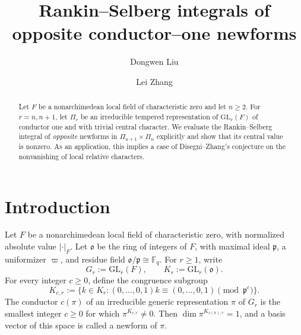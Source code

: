 \documentclass[11pt, a4paper]{amsart}
\newcommand{\GL}{{\mathrm{GL}}}
\newcommand{\p}{\frac{\partial\bar\partial}{\Pi i}}
\renewcommand{\p}{\mathfrak p}
\renewcommand{\o}{\mathfrak o}
\newcommand{\abs}[1]{\lvert#1\rvert}
\theoremstyle{plain}
\theoremstyle{plain}
\theoremstyle{plain}
\theoremstyle{plain}
\theoremstyle{remark}
\theoremstyle{definition}
\theoremstyle{plain}
\numberwithin{equation}{section}
\begin{document}
\title[Rankin--Selberg integrals of opposite conductor-one  newforms]{Rankin--Selberg integrals of opposite conductor--one newforms}

 \author[D. Liu]{Dongwen Liu}
\address{School of Mathematical Sciences, Zhejiang University, 866 Yuhangtang Road, Hangzhou 310058, P.R. China}

\author[L. Zhang]{Lei Zhang}
\address{Department of Mathematics, National University of Singapore, Singapore 119076}




\begin{abstract}
Let $F$ be a nonarchimedean local field of characteristic zero and let $n\geq2$.  For
$r=n,n+1$, let $\Pi_r$ be an irreducible tempered representation of
$\GL_r(F)$ of conductor one and with trivial central character.  
We evaluate the Rankin--Selberg integral of {\it opposite} newforms in $\Pi_{n+1}\times  \Pi_n$ explicitly and show that its central value is nonzero. As an application, this implies a case of Disegni--Zhang's conjecture on the nonvanishing of local relative characters.
\end{abstract}

\maketitle



\section{Introduction}
\label{sec:intro}


Let $F$ be a nonarchimedean local field of characteristic zero, with normalized absolute value $\abs{\cdot}_F$.  Let $\o$ be the ring of integers of $F$, with maximal ideal $\p$, a uniformizer $\varpi$, and 
residue field $\o/\p\cong\mathbb F_q$.
For $r\geq1$, write
\[
 G_r :=\GL_r(F),\qquad K_r:=\GL_r(\o).
\]
For every integer $c\geq 0$, define the congruence subgroup
\[
K_{c, r}:=\{ k\in K_r: (0,\ldots,0,1)k\equiv(0,\ldots,0,1)\pmod{\p^c}\}.
\]
The conductor $c(\pi)$ of an irreducible generic representation $\pi$ of
$G_r$ is the smallest integer $c\geq0$ for which
$\pi^{K_{c,r}}\neq0$.  Then
$\dim\pi^{K_{c(\pi),r}}=1$, and a basis vector of this space is called a
newform of $\pi$.
\end{document}
